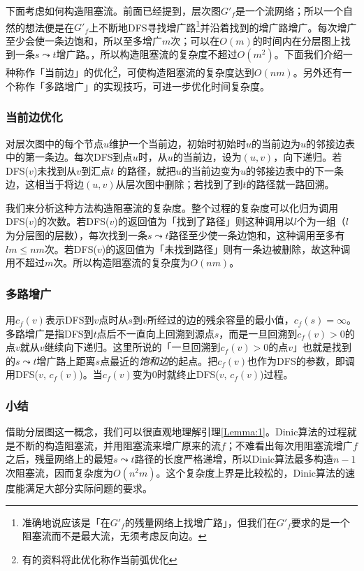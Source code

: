 \documentclass{ctexbook}
\begin{document}
    下面考虑如何构造阻塞流。前面已经提到，层次图$G'_f$是一个流网络；所以一个自然的想法便是在$G'_f$上不断地DFS寻找增广路\footnote{准确地说应该是「在$G'_f$的残量网络上找增广路」，但我们在$G'_f$要求的是一个阻塞流而不是最大流，无须考虑反向边。}并沿着找到的增广路增广。每次增广至少会使一条边饱和，所以至多增广$m$次；可以在$O(m)$的时间内在分层图上找到一条$s\leadsto t$增广路。，所以构造阻塞流的复杂度不超过$O(m^2)$。下面我们介绍一种称作「当前边」的优化\footnote{有的资料将此优化称作当前弧优化}，可使构造阻塞流的复杂度达到$O(nm)$。另外还有一个称作「多路增广」的实现技巧，可进一步优化时间复杂度。
    \subsubsection*{当前边优化}
    对层次图中的每个节点$u$维护一个当前边，初始时初始时$u$的当前边为$u$的邻接边表中的第一条边。每次DFS到点$u$时，从$u$的当前边，设为$(u,v)$，向下递归。若DFS($v$)未找到从$v$到汇点$t$ 的路径，就把$u$的当前边变为$u$的邻接边表中的下一条边，这相当于将边$(u,v)$从层次图中删除；若找到了到$t$的路径就一路回溯。

    我们来分析这种方法构造阻塞流的复杂度。整个过程的复杂度可以化归为调用DFS($v$)的次数。若DFS($v$)的返回值为「找到了路径」则这种调用以$l$个为一组（$l$为分层图的层数），每次找到一条$s\leadsto t$路径至少使一条边饱和，这种调用至多有$lm\le nm$次。若DFS($v$)的返回值为「未找到路径」则有一条边被删除，故这种调用不超过$m$次。所以构造阻塞流的复杂度为$O(nm)$。
    \subsubsection*{多路增广}
    用$c_f(v)$表示DFS到$v$点时从$s$到$v$所经过的边的残余容量的最小值，$c_f(s) = \infty$。
    多路增广是指DFS到$t$点后不一直向上回溯到源点$s$，而是一旦回溯到$c_f(v)>0$的点$v$就从$v$继续向下递归。这里所说的「一旦回溯到$c_f(v)>0$的点$v$」也就是找到的$s\leadsto t$增广路上距离$s$点最近的\emph{饱和边}的起点。把$c_f(v)$也作为DFS的参数，即调用DFS($v$, $c_f(v)$)。当$c_f(v)$变为$0$时就终止DFS($v$, $c_f(v)$)过程。

    \subsubsection*{小结}
    借助分层图这一概念，我们可以很直观地理解引理\ref{Lemma:1}。Dinic算法的过程就是不断的构造阻塞流，并用阻塞流来增广原来的流$f$；不难看出每次用阻塞流增广$f$之后，残量网络上的最短$s\leadsto t$路径的长度严格递增，所以Dinic算法最多构造$n-1$次阻塞流，因而复杂度为$O(n^2m)$。这个复杂度上界是比较松的，Dinic算法的速度能满足大部分实际问题的要求。
\end{document}
